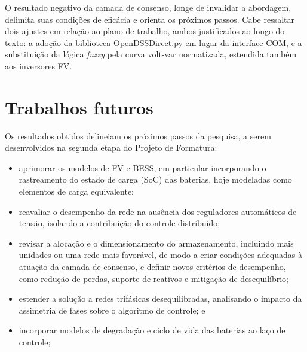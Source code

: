 O resultado negativo da camada de consenso, longe de invalidar a abordagem, delimita suas 
condições de eficácia e orienta os próximos passos. Cabe ressaltar dois ajustes em relação ao 
plano de trabalho, ambos justificados ao longo do texto: a adoção da biblioteca 
OpenDSSDirect.py em lugar da interface COM, e a substituição da lógica \emph{fuzzy} pela curva 
volt-var normatizada, estendida também aos inversores FV.

\section{Trabalhos futuros}
\label{sec:futuro}

Os resultados obtidos delineiam os próximos passos da pesquisa, a serem desenvolvidos na 
segunda etapa do Projeto de Formatura:

\begin{itemize}
  \item aprimorar os modelos de FV e BESS, em particular incorporando o rastreamento do estado de carga (SoC) das baterias, hoje modeladas como elementos de carga equivalente;
  \item reavaliar o desempenho da rede na ausência dos reguladores automáticos de tensão, isolando a contribuição do controle distribuído;
  \item revisar a alocação e o dimensionamento do armazenamento, incluindo mais unidades ou uma rede mais favorável, de modo a criar condições adequadas à atuação da camada de consenso, e definir novos critérios de desempenho, como redução de perdas, suporte de reativos e mitigação de desequilíbrio;
  \item estender a solução a redes trifásicas desequilibradas, analisando o impacto da assimetria de fases sobre o algoritmo de controle; e
  \item incorporar modelos de degradação e ciclo de vida das baterias ao laço de controle;
\end{itemize}
